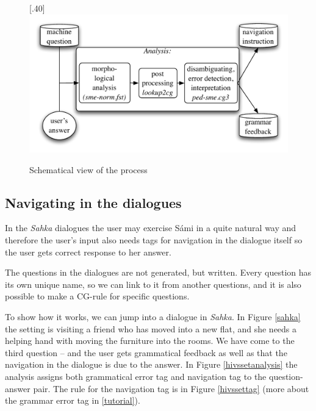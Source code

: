\documentclass[11pt]{article}
\begin{document}
\begin{figure}[htbp]
\begin{center}
\scalebox{.40}[.40]{\includegraphics{presentation/img/qa2.pdf}}\\
\caption{Schematical view of the process}
\end{center}
\end{figure}


\subsection{Navigating in the dialogues}
In the \textit{Sahka} dialogues the user may exercise Sámi in a quite natural way and therefore the user's input also needs tags for navigation in the dialogue itself so the user gets correct response to her answer.

The questions in the dialogues are not generated, but written. Every question has its own unique name, so we can link to it from another questions, and it is also possible to make a CG-rule for specific questions.  

To show how it works, we can jump into a dialogue in \textit{Sahka}. In Figure \ref{sahka} the setting is visiting a friend who has moved into a new flat, and she needs a helping hand with moving the furniture into the rooms. We have come to the third question – and the user gets grammatical feedback as well as that the navigation in the dialogue is due to the answer. In Figure \ref{hivssetanalysis} the analysis assigns both grammatical error tag  and navigation tag to the question-answer pair. The rule for the navigation tag is in Figure \ref{hivssettag} (more about the grammar error tag in \ref{tutorial}).
 
\end{document}
